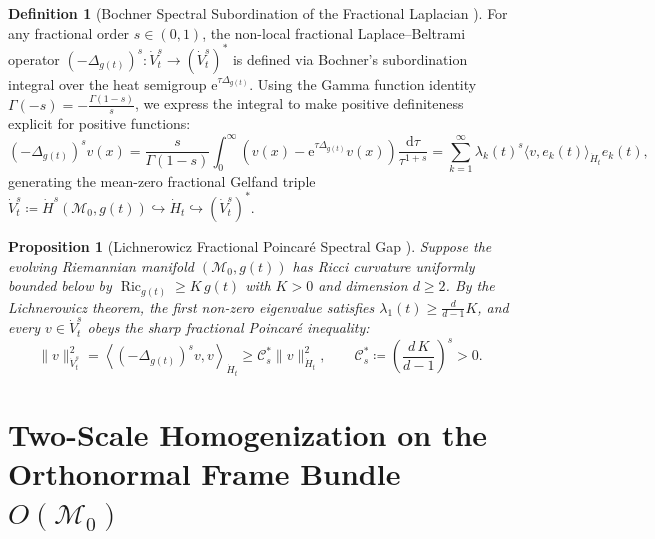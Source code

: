 \documentclass[11pt,a4paper,reqno]{article}
\newtheorem{proposition}[theorem]{Proposition}
\theoremstyle{definition}
\newtheorem{definition}[theorem]{Definition}
\theoremstyle{remark}
\begin{document}
\begin{definition}[Bochner Spectral Subordination of the Fractional Laplacian \cite{caffarelli2007extension, kwasnicki2017ten}]
For any fractional order $s \in (0, 1)$, the non-local fractional Laplace--Beltrami operator $(-\Delta_{g(t)})^s : \dot{V}_t^s \to (\dot{V}_t^s)^*$ is defined via Bochner's subordination integral over the heat semigroup $\mathrm{e}^{\tau \Delta_{g(t)}}$. Using the Gamma function identity $\Gamma(-s) = -\frac{\Gamma(1-s)}{s}$, we express the integral to make positive definiteness explicit for positive functions:
\begin{equation}\label{eq:bochner_subordination}
  (-\Delta_{g(t)})^s v(x) = \frac{s}{\Gamma(1-s)} \int_0^\infty \left( v(x) - \mathrm{e}^{\tau \Delta_{g(t)}} v(x) \right) \frac{\mathrm{d}\tau}{\tau^{1+s}} = \sum_{k=1}^\infty \lambda_k(t)^s \langle v, e_k(t) \rangle_{\dot{H}_t} e_k(t),
\end{equation}
generating the mean-zero fractional Gelfand triple $\dot{V}_t^s \coloneqq \dot{H}^s(\mathcal{M}_0, g(t)) \hookrightarrow \dot{H}_t \hookrightarrow (\dot{V}_t^s)^*$.
\end{definition}

\begin{proposition}[Lichnerowicz Fractional Poincaré Spectral Gap \cite{lichnerowicz1958geometrie, ananda2026stochastic_fluid_v2}]\label{prop:lichnerowicz_gap}
Suppose the evolving Riemannian manifold $(\mathcal{M}_0, g(t))$ has Ricci curvature uniformly bounded below by $\operatorname{Ric}_{g(t)} \ge K\,g(t)$ with $K > 0$ and dimension $d \ge 2$. By the Lichnerowicz theorem, the first non-zero eigenvalue satisfies $\lambda_1(t) \ge \frac{d}{d-1}K$, and every $v \in \dot{V}_t^s$ obeys the sharp fractional Poincaré inequality:
\begin{equation}\label{eq:fractional_poincare}
  \|v\|_{\dot{V}_t^s}^2 = \left\langle (-\Delta_{g(t)})^s v, v \right\rangle_{\dot{H}_t} \ge \mathcal{C}_s^* \|v\|_{\dot{H}_t}^2, \qquad \mathcal{C}_s^* \coloneqq \left( \frac{d\,K}{d-1} \right)^s > 0.
\end{equation}
\end{proposition}

\section{Two-Scale Homogenization on the Orthonormal Frame Bundle $O(\mathcal{M}_0)$}
\end{document}
